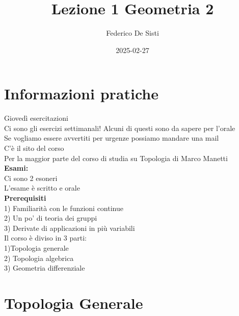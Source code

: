 \documentclass[12px]{article}
\title{Lezione 1 Geometria 2}
\date{2025-02-27}
\author{Federico De Sisti}
\begin{document}
	\maketitle
	\newpage
	\section{Informazioni pratiche}
	Giovedì esercitazioni\\
	Ci sono gli esercizi settimanali! Alcuni di questi sono da sapere per l'orale\\
	Se vogliamo essere avvertiti per urgenze possiamo mandare una mail\\
	C'è il sito del corso\\
	Per la maggior parte del corso di studia su Topologia di Marco Manetti\\
	\textbf{Esami:}\\
	Ci sono 2 esoneri\\
	L'esame è scritto e orale\\
	\textbf{Prerequisiti}\\
	1) Familiarità con le funzioni continue\\
	2) Un po' di teoria dei gruppi\\
	3) Derivate di applicazioni in più variabili\\[10px]
	Il corso è diviso in 3 parti:\\
	1)Topologia generale\\
	2) Topologia algebrica\\
	3) Geometria differenziale\\
	\section{Topologia Generale}
\end{document}
